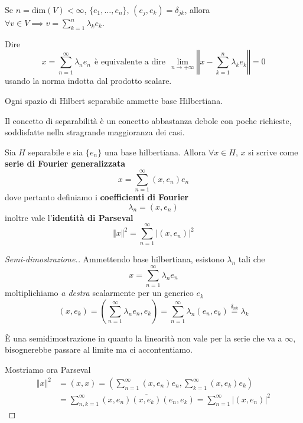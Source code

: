 \begin{rem}
Se $n = \mathrm{dim}(V) < \infty $, $\{e_{1}, \dotsc, e_{n}\}$, $(e_{j}, e_{k}) = \delta_{jk}$, allora $\forall v\in V\implies v = \sum^{n}_{k = 1} \lambda_{k} e_{k}$.
\end{rem}
\begin{rem}
Dire
\begin{equation*}
x = \sum^{\infty}_{n = 1} \lambda_{n} e_{n} \ \ \text{è equivalente a dire} \ \ \lim\limits_{n\rightarrow + \infty}\left \Vert x - \sum^{n}_{k = 1} \lambda_{k} e_{k}\right \Vert = 0
\end{equation*}
usando la norma indotta dal prodotto scalare.
\end{rem}
\begin{thm}
Ogni spazio di Hilbert separabile ammette base Hilbertiana.
\end{thm}
\begin{rem}
Il concetto di separabilità è un concetto abbastanza debole con poche richieste, soddisfatte nella stragrande maggioranza dei casi.
\end{rem}
\begin{thm}
Sia $H$ separabile e sia $\{e_{n}\}$ una base hilbertiana. Allora $\forall x\in H$, $x$ si scrive come \textbf{serie di Fourier generalizzata}
\begin{equation*}
x = \sum^{\infty}_{n = 1}(x, e_{n}) e_{n}
\end{equation*}
dove pertanto definiamo i \textbf{coefficienti di Fourier}
\begin{equation*}
\lambda_{n} = (x, e_{n})
\end{equation*}
inoltre vale l'\textbf{identità di Parseval}
\begin{equation*}
\Vert x \Vert^{2} = \sum\limits^{\infty}_{n = 1}| (x, e_{n})|^{2}
\end{equation*}
\end{thm}
\begin{proof}[Semi-dimostrazione.]

Ammettendo base hilbertiana, esistono $\lambda_{n}$ tali che
\begin{equation*}
x = \sum^{\infty}_{n = 1} \lambda_{n} e_{n}
\end{equation*}
moltiplichiamo \textit{a destra} scalarmente per un generico $e_{k}$
\begin{equation*}
(x, e_{k}) = \left(\sum^{\infty}_{n = 1} \lambda_{n} e_{n}, e_{k}\right) = \sum^{\infty}_{n = 1} \lambda_{n}(e_{n}, e_{k})\overset{\delta_{nk}}{=} \lambda_{k}
\end{equation*}
\begin{rem}
È una semidimostrazione in quanto la linearità non vale per la serie che va a $\infty $, bisognerebbe passare al limite ma ci accontentiamo.
\end{rem}
Mostriamo ora Parseval
\begin{align*}
\Vert x \Vert^{2} & = (x, x) = \left(\sum^{\infty}_{n = 1}(x, e_{n}) e_{n}, \sum^{\infty}_{k = 1}(x, e_{k}) e_{k}\right)\\
 & = \sum\limits^{\infty}_{n, k = 1}(x, e_{n})\overline{(x, e_{k})}(e_{n}, e_{k}) = \sum\limits^{\infty}_{n = 1}| (x, e_{n})|^{2}
\end{align*}
\end{proof}
